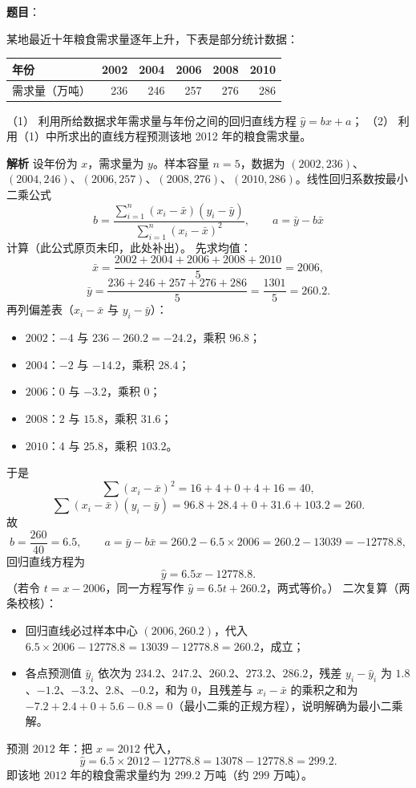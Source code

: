 \begin{answer}

\textbf{题目}：

某地最近十年粮食需求量逐年上升，下表是部分统计数据：

\begin{center}
\begin{tabular}{lrrrrr}
\toprule
年份 & 2002 & 2004 & 2006 & 2008 & 2010 \\
\midrule
需求量（万吨） & 236 & 246 & 257 & 276 & 286 \\
\bottomrule
\end{tabular}
\end{center}

（1） 利用所给数据求年需求量与年份之间的回归直线方程 $\hat y=bx+a$；
（2） 利用（1）中所求出的直线方程预测该地 2012 年的粮食需求量。

\textbf{解析}
设年份为 $x$，需求量为 $y$。样本容量 $n=5$，数据为 $(2002,236)$、$(2004,246)$、$(2006,257)$、$(2008,276)$、$(2010,286)$。线性回归系数按最小二乘公式
\nopagebreak[4]
\[
b=\frac{\sum_{i=1}^{n}(x_i-\bar x)(y_i-\bar y)}{\sum_{i=1}^{n}(x_i-\bar x)^2},\qquad a=\bar y-b\bar x
\]
计算（此公式原页未印，此处补出）。
先求均值：
\nopagebreak[4]
\[
\bar x=\frac{2002+2004+2006+2008+2010}{5}=2006,
\]
\nopagebreak[4]
\[
\bar y=\frac{236+246+257+276+286}{5}=\frac{1301}{5}=260.2.
\]
再列偏差表（$x_i-\bar x$ 与 $y_i-\bar y$）：
\begin{itemize}
\item $2002$：$-4$ 与 $236-260.2=-24.2$，乘积 $96.8$；
\item $2004$：$-2$ 与 $-14.2$，乘积 $28.4$；
\item $2006$：$0$ 与 $-3.2$，乘积 $0$；
\item $2008$：$2$ 与 $15.8$，乘积 $31.6$；
\item $2010$：$4$ 与 $25.8$，乘积 $103.2$。
\end{itemize}
于是
\nopagebreak[4]
\[
\sum(x_i-\bar x)^2=16+4+0+4+16=40,
\]
\nopagebreak[4]
\[
\sum(x_i-\bar x)(y_i-\bar y)=96.8+28.4+0+31.6+103.2=260.
\]
故
\nopagebreak[4]
\[
b=\frac{260}{40}=6.5,\qquad a=\bar y-b\bar x=260.2-6.5\times2006=260.2-13039=-12778.8,
\]
回归直线方程为
\nopagebreak[4]
\[
\hat y=6.5x-12778.8.
\]
（若令 $t=x-2006$，同一方程写作 $\hat y=6.5t+260.2$，两式等价。）
二次复算（两条校核）：
\begin{itemize}
\item 回归直线必过样本中心 $(2006,260.2)$，代入 $6.5\times2006-12778.8=13039-12778.8=260.2$，成立；
\item 各点预测值 $\hat y_i$ 依次为 $234.2$、$247.2$、$260.2$、$273.2$、$286.2$，残差 $y_i-\hat y_i$ 为 $1.8$、$-1.2$、$-3.2$、$2.8$、$-0.2$，和为 $0$，且残差与 $x_i-\bar x$ 的乘积之和为 $-7.2+2.4+0+5.6-0.8=0$（最小二乘的正规方程），说明解确为最小二乘解。
\end{itemize}
预测 $2012$ 年：把 $x=2012$ 代入，
\nopagebreak[4]
\[
\hat y=6.5\times2012-12778.8=13078-12778.8=299.2.
\]
即该地 $2012$ 年的粮食需求量约为 $299.2$ 万吨（约 $299$ 万吨）。


\end{answer}
